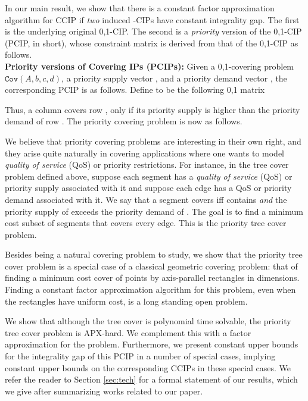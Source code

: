 \documentclass[11pt]{article}
\newcommand{\cov}[1]{\ensuremath{\mathtt{Cov}(#1)}}
\newcommand{\1}{\mathbb{1}}
\begin{document}
In our main result, we show that there is a constant factor
approximation algorithm for CCIP if {\em two} induced -CIPs have
constant integrality gap.  The first is the underlying original
0,1-CIP.  The second is a {\em priority} version of the 0,1-CIP (PCIP, in
short), whose constraint matrix is derived from that of the 0,1-CIP
as follows. \\

\noindent
{\bf Priority versions of Covering IPs (PCIPs):}
Given a 0,1-covering problem \cov{A,b,c,d}, a priority supply
vector , and a priority demand vector ,
the corresponding PCIP is as follows. Define  to be the
following 0,1 matrix

Thus, a column  covers row , only if its priority supply is
higher than the priority demand of row .  The priority covering
problem is now as follows.


We believe that priority covering problems are interesting in their
own right, and they arise quite naturally in covering applications
where one wants to model {\em quality of service} (QoS) or priority
restrictions. For instance,  in the tree cover problem
defined above,
suppose each segment  has a {\em quality of
  service} (QoS) or priority supply  associated with it and suppose each edge
 has a QoS or priority demand  associated with it. We say that a segment
 covers  iff  contains  {\em and} the priority supply of 
exceeds the priority demand of . The goal is to find a minimum cost
subset of segments that covers every edge. This is the priority tree cover problem.







Besides being a natural covering problem to study, we show that the
priority tree cover problem is a special case of a classical geometric
covering problem: that of finding a minimum cost cover of points by
axis-parallel rectangles in  dimensions.  Finding a constant factor
approximation algorithm for this problem, even when the rectangles
have uniform cost, is a long standing open problem. 


We show that although the tree cover is polynomial time solvable, the priority
tree cover problem is APX-hard. 
We complement this with a factor  approximation for
the problem. Furthermore, we present constant upper bounds for
the integrality gap of this PCIP in a number of special cases, implying
constant upper bounds on the corresponding CCIPs in these special cases.
We refer the reader to Section \ref{sec:tech} for a formal statement of our results,
which we give after summarizing works related to our paper.
\end{document}
